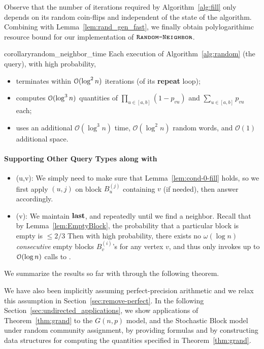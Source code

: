 Observe that the number of iterations required by Algorithm~\ref{alg:fill} only depends on its random coin-flips and independent of the state of the algorithm.
Combining with Lemma~\ref{lem:rand_gen_fast}, we finally obtain polylogarithimc resource bound for our implementation of $\texttt{\textsc{Random-Neighbor}}$.

\begin{restatable}{corollary}{random_neighbor_time}
\label{cor:random_neighbor_time}
Each execution of Algorithm~\ref{alg:random} (the  query), with high probability,
\begin{itemize}
\item terminates within $\mathcal{O}(\log^2 n)$ iterations (of its \textup{\textbf{repeat}} loop);
\item computes $\mathcal{O}(\log^3 n)$ quantities of $\prod_{u \in [a,b]} (1-p_{vu})$ and $\sum_{u\in[a,b]} p_{vu}$ each;
\item uses an additional $\mathcal O(\log^3 n)$ time, $\mathcal O(\log^2 n)$ random words, and $\mathcal O(1)$ additional space.
\end{itemize}
\end{restatable}

\paragraph*{Supporting Other Query Types along with }
\begin{itemize}
\item {}(u,v): We simply need to make sure that Lemma~\ref{lem:cond-0-fill} holds, so we first apply $(u,j)$ on block $B_u^{(j)}$ containing $v$ (if needed), then answer accordingly.
\item {}(v): We maintain $\mathbf{last}$, and  repeatedly until we find a neighbor. Recall that by Lemma~\ref{lem:EmptyBlock}, the probability that a particular block is empty is $\le 2/3$ Then with high probability, there exists no $\omega(\log n)$ \emph{consecutive} empty blocks $B^{(i)}_v$'s for any vertex $v$, and thus  only invokes up to $\mathcal{O}(\log n)$ calls to .
\end{itemize}

We summarize the results so far with through the following theorem.

\UndirectedGrand*

We have also been implicitly assuming perfect-precision arithmetic and we relax this assumption in Section~\ref{sec:remove-perfect}.
In the following Section~\ref{sec:undirected_applications}, we show applications of Theorem~\ref{thm:grand} to the $G(n,p)$ model,
and the Stochastic Block model under random community assignment,
by providing formulas and by constructing data structures for computing the quantities specified in Theorem~\ref{thm:grand}.
